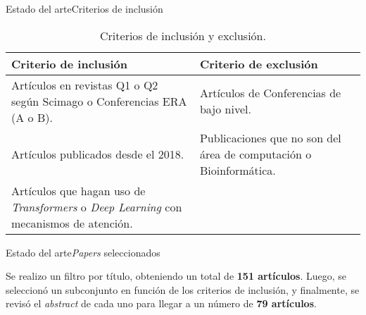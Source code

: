 \documentclass[10pt]{beamer}
\newcommand{\1}{
	\setbeamertemplate{background}{
		\texttt{[image: img/1]}
		\tikz[overlay] \fill[fill opacity=0.75,fill=white] (0,0) rectangle (-\paperwidth,\paperheight);
	}
}
\begin{document}
\begin{frame}{Estado del arte}{Criterios de inclusión}
	
\begin{table}[h]
	\begin{center}
		\caption{Criterios de inclusión y exclusión.}
		\label{tab:criterios}
		\scriptsize
		\setlength{\tabcolsep}{0.5em} %
		{\renewcommand{\arraystretch}{1.5}%
			\begin{tabular}{p{5cm}p{5cm}}
				\textbf{Criterio de inclusión}                                                   & \textbf{Criterio de exclusión}                                                           \\ \hline
				Artículos en revistas Q1 o Q2 según Scimago o Conferencias ERA (A o B). & Artículos de Conferencias de bajo nivel.  \\
				
				Artículos publicados desde el 2018. & Publicaciones que no son del área de computación o Bioinformática. \\      
				
				Artículos que hagan uso de \textit{Transformers} o \textit{Deep Learning} con mecanismos de atención. & \\                                                                                                 
			\end{tabular}
		}
	\end{center}
\end{table}
	
\end{frame}


\begin{frame}{Estado del arte}{\textit{Papers} seleccionados}
	\begin{block}{}
		Se realizo un filtro por título, obteniendo un total de \textbf{151 artículos}. Luego, se seleccionó un subconjunto en función de los criterios de inclusión, y finalmente, se revisó el \textit{abstract} de cada uno para llegar a un número de \textbf{79 artículos}.
	\end{block}

	
\end{frame}
\end{document}
